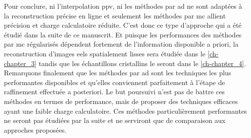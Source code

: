 Pour conclure, ni l'interpolation \gls{ppv}, ni les méthodes par \gls{ad} ne sont adaptées à la reconstruction précise en ligne et seulement les méthodes par \gls{mc} allient précision et charge calculatoire réduite. C'est donc ce type d'approche qui a été étudié dans la suite de ce manuscrit. Et puisque les performances des méthodes par \gls{mc} régularisés dépendent fortement de l'information disponible a priori, la reconstruction d'images \gls{eels} spatialement lisses sera étudiée dans le \cref{ch-chapter_3} tandis que les échantillons cristallins le seront dans le \cref{ch-chapter_4}. Remarquons finalement que les méthodes par \gls{ad} sont les techniques les plus performantes disponibles et qu'elles conviennent parfaitement à l'étape de raffinement effectuée a posteriori. Le but poursuivi n'est pas de battre ces méthodes en termes de performance, mais de proposer des techniques efficaces ayant une faible charge calculatoire.  Ces méthodes particulièrement performantes ne seront pas étudiées par la suite et ne serviront que de comparaison aux approches proposées. 

